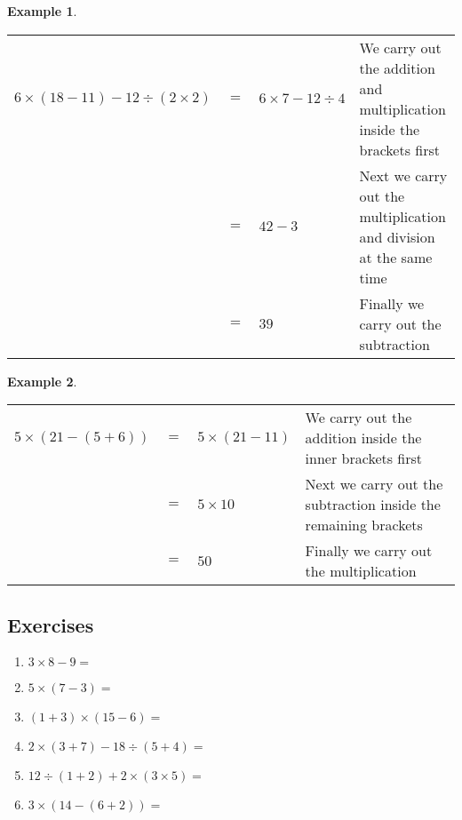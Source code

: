 \documentclass[11pt, oneside]{article}
\theoremstyle{definition}
\newtheorem{exmp}{Example}[section]
\begin{document}
\begin{exmp} \end{exmp}
\begin{table}[H]
\begin{tabular}{p{4cm}p{0.3cm}p{2cm}p{9.5cm}}
$6\times (18 - 11) - 12\div (2\times 2) $ & $=$ & $6\times 7 - 12\div 4$ & We carry out the addition and multiplication inside the brackets first \\
 & $=$ & $42 - 3$ & Next we carry out the multiplication and division at the same time \\
 & $=$ & $39$ & Finally we carry out the subtraction \\
\end{tabular}
\end{table}

\begin{exmp} \end{exmp}
\begin{table}[H]
\begin{tabular}{p{2.5cm}p{0.3cm}p{2cm}p{11cm}}
$5\times (21 - (5 + 6))$ & $=$ & $5\times (21 - 11)$ & We carry out the addition inside the inner brackets first \\
 & $=$ & $5\times 10$ & Next we carry out the subtraction inside the remaining brackets \\
 & $=$ & $50$ & Finally we carry out the multiplication \\
\end{tabular}
\end{table}

\subsection{Exercises}
\begin{enumerate}
\item $3\times 8 - 9 = $
\item $5 \times (7 - 3) = $
\item $(1 + 3)\times (15 - 6) =$
\item $2\times (3 + 7) - 18\div (5 + 4) =$
\item $12\div (1 + 2) + 2\times (3\times 5) =$
\item $3\times (14 - (6 + 2)) =$
\end{enumerate}
\end{document}
